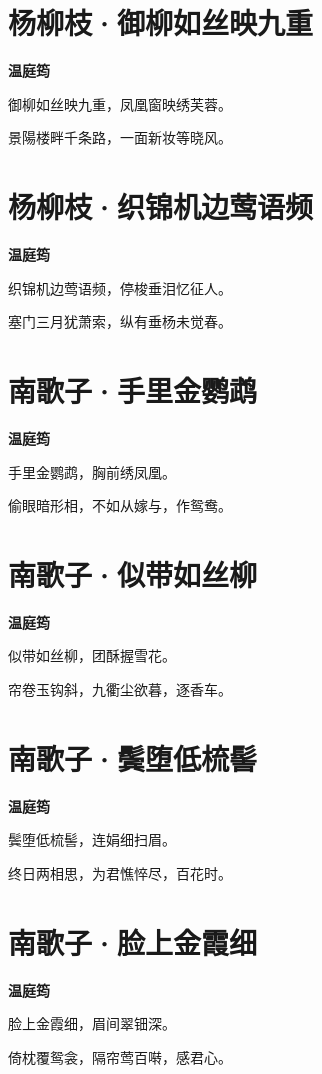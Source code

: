 \documentclass[12pt,a4paper]{ctexbook}
\begin{document}
\section{杨柳枝·御柳如丝映九重}
\textbf{温庭筠}\par\vspace{0.5em}
御柳如丝映九重，凤凰窗映绣芙蓉。\par
景陽楼畔千条路，一面新妆等晓风。\par

\section{杨柳枝·织锦机边莺语频}
\textbf{温庭筠}\par\vspace{0.5em}
织锦机边莺语频，停梭垂泪忆征人。\par
塞门三月犹萧索，纵有垂杨未觉春。\par

\section{南歌子·手里金鹦鹉}
\textbf{温庭筠}\par\vspace{0.5em}
手里金鹦鹉，胸前绣凤凰。\par
偷眼暗形相，不如从嫁与，作鸳鸯。\par

\section{南歌子·似带如丝柳}
\textbf{温庭筠}\par\vspace{0.5em}
似带如丝柳，团酥握雪花。\par
帘卷玉钩斜，九衢尘欲暮，逐香车。\par

\section{南歌子·鬓堕低梳髻}
\textbf{温庭筠}\par\vspace{0.5em}
鬓堕低梳髻，连娟细扫眉。\par
终日两相思，为君憔悴尽，百花时。\par

\section{南歌子·脸上金霞细}
\textbf{温庭筠}\par\vspace{0.5em}
脸上金霞细，眉间翠钿深。\par
倚枕覆鸳衾，隔帘莺百啭，感君心。\par
\end{document}
